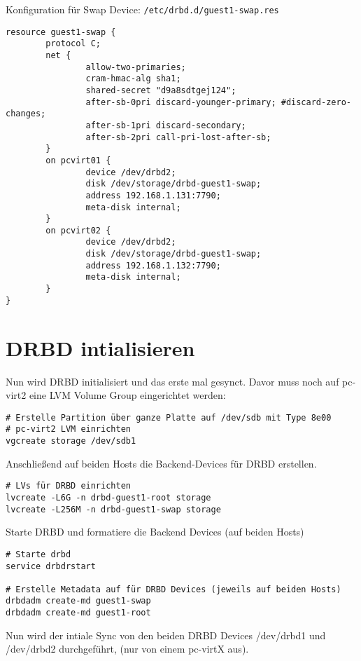 Konfiguration für Swap Device: \verb|/etc/drbd.d/guest1-swap.res|
\setupVerbatimOut
\begin{verbatim}
resource guest1-swap {
        protocol C;
        net {
                allow-two-primaries;
                cram-hmac-alg sha1;
                shared-secret "d9a8sdtgej124";
                after-sb-0pri discard-younger-primary; #discard-zero-changes;
                after-sb-1pri discard-secondary;
                after-sb-2pri call-pri-lost-after-sb;
        }
        on pcvirt01 {
                device /dev/drbd2;
                disk /dev/storage/drbd-guest1-swap;
                address 192.168.1.131:7790;
                meta-disk internal;
        }
        on pcvirt02 {
                device /dev/drbd2;
                disk /dev/storage/drbd-guest1-swap;
                address 192.168.1.132:7790;
                meta-disk internal;
        }
}
\end{verbatim}


\section{DRBD intialisieren}

Nun wird DRBD initialisiert und das erste mal gesynct. Davor muss noch auf pc-virt2 eine LVM Volume Group eingerichtet werden:

\setupVerbatimOut
\begin{verbatim}
# Erstelle Partition über ganze Platte auf /dev/sdb mit Type 8e00
# pc-virt2 LVM einrichten
vgcreate storage /dev/sdb1 
\end{verbatim}

Anschließend auf beiden Hosts die Backend-Devices für DRBD erstellen.

\setupVerbatimOut
\begin{verbatim}
# LVs für DRBD einrichten
lvcreate -L6G -n drbd-guest1-root storage
lvcreate -L256M -n drbd-guest1-swap storage
\end{verbatim}

Starte DRBD und formatiere die Backend Devices (auf beiden Hosts)

\setupVerbatimOut
\begin{verbatim}
# Starte drbd
service drbdrstart

# Erstelle Metadata auf für DRBD Devices (jeweils auf beiden Hosts)
drbdadm create-md guest1-swap
drbdadm create-md guest1-root
\end{verbatim}


Nun wird der intiale Sync von den beiden DRBD Devices /dev/drbd1 und /dev/drbd2 durchgeführt, (nur von einem pc-virtX aus).

